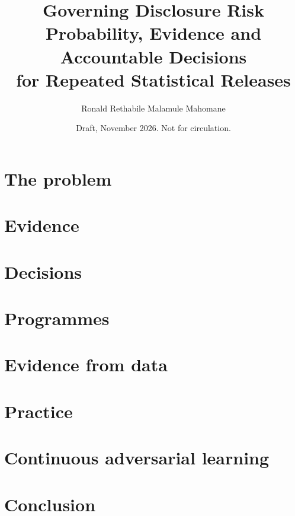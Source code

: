 \documentclass[11pt,a4paper,openany]{book}
\title{Governing Disclosure Risk\\[6pt]
  \large Probability, Evidence and Accountable Decisions\\for Repeated Statistical Releases}
\author{Ronald Rethabile Malamule Mahomane}
\date{Draft, November 2026. Not for circulation.}
\begin{document}
\frontmatter
\maketitle
\tableofcontents


\mainmatter
\part{The problem}




\part{Evidence}




\part{Decisions}



\part{Programmes}



\part{Evidence from data}





\part{Practice}




\part{Continuous adversarial learning}






\part{Conclusion}


\appendix



\backmatter

\end{document}
